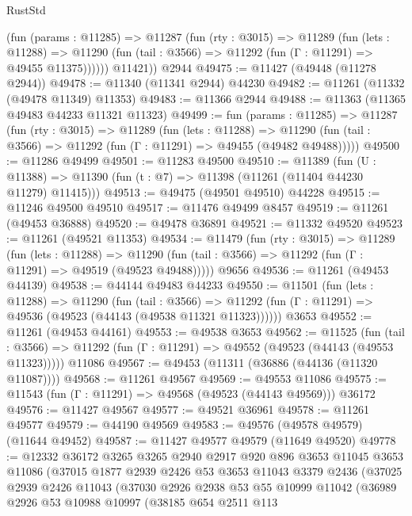 \begin{lexlean}{RustStd}
\begin{coremodule}
          (fun (params : @11285) =>
          @11287
            (fun (rty : @3015) =>
            @11289
              (fun (lets : @11288) =>
              @11290 (fun (tail : @3566) => @11292 (fun (Γ : @11291) => @49455 @11375))))))
        @11421))
    @2944
@49475 := @11427 (@49448 (@11278 @2944))
@49478 := @11340 (@11341 @2944) @44230
@49482 := @11261 (@11332 (@49478 @11349) @11353)
@49483 := @11366 @2944
@49488 := @11363 (@11365 @49483 @44233 @11321 @11323)
@49499 := fun (params : @11285) =>
  @11287
    (fun (rty : @3015) =>
    @11289
      (fun (lets : @11288) =>
      @11290 (fun (tail : @3566) => @11292 (fun (Γ : @11291) => @49455 (@49482 @49488)))))
@49500 := @11286 @49499
@49501 := @11283 @49500
@49510 := @11389
    (fun (U : @11388) => @11390 (fun (t : @7) => @11398 (@11261 (@11404 @44230 @11279) @11415)))
@49513 := @49475 (@49501 @49510) @44228
@49515 := @11246 @49500 @49510
@49517 := @11476 @49499 @8457
@49519 := @11261 (@49453 @36888)
@49520 := @49478 @36891
@49521 := @11332 @49520
@49523 := @11261 (@49521 @11353)
@49534 := @11479
    (fun (rty : @3015) =>
    @11289
      (fun (lets : @11288) =>
      @11290 (fun (tail : @3566) => @11292 (fun (Γ : @11291) => @49519 (@49523 @49488)))))
    @9656
@49536 := @11261 (@49453 @44139)
@49538 := @44144 @49483 @44233
@49550 := @11501
    (fun (lets : @11288) =>
    @11290
      (fun (tail : @3566) =>
      @11292 (fun (Γ : @11291) => @49536 (@49523 (@44143 (@49538 @11321 @11323))))))
    @3653
@49552 := @11261 (@49453 @44161)
@49553 := @49538 @3653
@49562 := @11525
    (fun (tail : @3566) => @11292 (fun (Γ : @11291) => @49552 (@49523 (@44143 (@49553 @11323)))))
    @11086
@49567 := @49453 (@11311 (@36886 (@44136 (@11320 @11087))))
@49568 := @11261 @49567
@49569 := @49553 @11086
@49575 := @11543 (fun (Γ : @11291) => @49568 (@49523 (@44143 @49569))) @36172
@49576 := @11427 @49567
@49577 := @49521 @36961
@49578 := @11261 @49577
@49579 := @44190 @49569
@49583 := @49576 (@49578 @49579) (@11644 @49452)
@49587 := @11427 @49577 @49579 (@11649 @49520)
@49778 := @12332
    @36172
    @3265
    @3265
    @2940
    @2917
    @920
    @896
    @3653
    @11045
    @3653
    @11086
    (@37015
      @1877
      @2939
      @2426
      @53
      @3653
      @11043
      @3379
      @2436
      (@37025
        @2939
        @2426
        @11043
        (@37030
          @2926
          @2938
          @53
          @55
          @10999
          @11042
          (@36989
            @2926
            @53
            @10988
            @10997
            (@38185
              @654
              @2511
              @113

\end{coremodule}
\end{lexlean}
